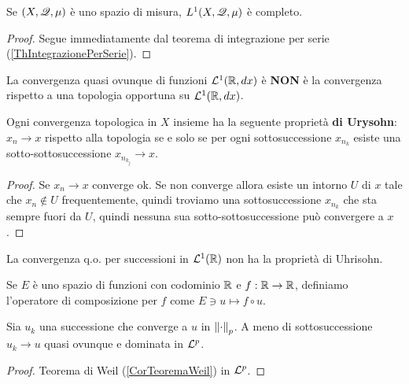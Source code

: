 \begin{proposition}[$L^1$ \`e completo]\label{PrL1Completo}
Se $(X,\mathscr{Q},\mu)$ \`e uno spazio di misura, $L^1(X,\mathscr{Q},\mu)$ \`e completo.
\end{proposition}
\begin{proof}
Segue immediatamente dal teorema di integrazione per serie (\ref{ThIntegrazionePerSerie}).
\end{proof}

\begin{remark}
La convergenza quasi ovunque di funzioni $\mathcal{L}^1(\mathbb{R},dx)$ \`e \textbf{NON} \`e la convergenza rispetto a una topologia opportuna su $\mathcal{L}^1(\mathbb{R},dx)$.

\begin{proposition}\label{PrProprietaUrysohn}
Ogni convergenza topologica in $X$ insieme ha la seguente propriet\`a \textbf{di Urysohn}: $x_n\to x$ rispetto alla topologia se e solo se per ogni sottosuccessione $x_{n_k}$ esiste una sotto-sottosuccessione $x_{n_{k_j}}\to x$.
\end{proposition}
\begin{proof}
Se $x_n\to x$ converge ok. Se non converge allora esiste un intorno $U$ di $x$ tale che $x_n\notin U$ frequentemente, quindi troviamo una sottosuccessione $x_{n_k}$ che sta sempre fuori da $U$, quindi nessuna sua sotto-sottosuccessione pu\`o convergere a $x$.
\end{proof} 

La convergenza q.o. per successioni in $\mathcal{L}^1(\mathbb{R})$ non ha la propriet\`a di Uhrisohn.
\end{remark}

\begin{definition}
Se $E$ \`e uno spazio di funzioni con codominio $\mathbb{R}$ e $f:\mathbb{R}\to\mathbb{R}$, definiamo l'operatore di composizione per $f$ come $E\ni u\mapsto f\circ u$.
\end{definition}

\begin{lemma}
Sia $u_k$ una successione che converge a $u$ in ${\left\Vert{\cdot}\right\Vert}_p$. A meno di sottosuccessione $u_k\to u$ quasi ovunque e dominata in $\mathcal{L}^p$.
\end{lemma}
\begin{proof}
Teorema di Weil (\ref{CorTeoremaWeil}) in $\mathcal{L}^p$.
\end{proof}

